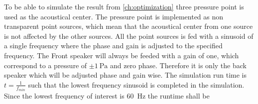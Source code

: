 To be able to simulate the result from \autoref{ch:optimization} three pressure point is used as the acoustical center. The pressure point is implemented as non transparent point sources, which mean that the acoustical center from one source is not affected by the other sources. All the point sources is fed with a sinusoid of a single frequency where the phase and gain is adjusted to the specified frequency. The Front speaker will always be feeded with a gain of one, which correspond to a pressure of $\pm \SI{1}{\pascal}$ and zero phase. Therefore it is only the back speaker which will be adjusted phase and gain wise. The simulation run time is $t=\frac{1}{f_{min}}$ such that the lowest frequency sinusoid is completed in the simulation. Since the lowest frequency of interest is \SI{60}{\hertz} the runtime shall be 

